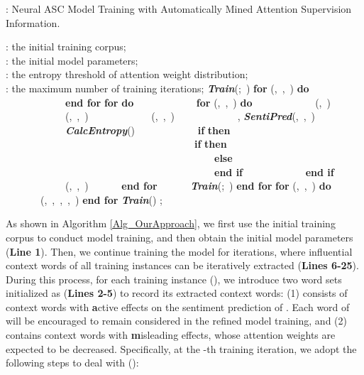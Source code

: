 \documentclass[11pt,a4paper]{article}
\begin{document}
{
\renewcommand\baselinestretch{1.15}
\begin{algorithm}[t]
\renewcommand{\algorithmicrequire}{\textbf{Input:}}\footnotesize
\renewcommand\algorithmicensure {\textbf{Return:} }\footnotesize
\caption{: Neural ASC Model Training with Automatically Mined Attention Supervision Information.}
\label{Alg_OurApproach}
\begin{algorithmic}[1]
\REQUIRE
: the initial training corpus;\\
: the initial model parameters;\\
: the entropy threshold of attention weight distribution;\\
: the maximum number of training iterations;
\STATE   \textit{\textbf{Train}}(;\ )
\STATE \textbf{for} (,\ ,\ )   \textbf{do}
\STATE \ \ \ \ \ \   
\STATE \ \ \ \ \ \   
\STATE \textbf{end for}
\STATE \textbf{for}  \textbf{do}
\STATE \ \ \ \ \ \   
\STATE \ \ \ \ \ \ \textbf{for} (,\ ,\ )   \textbf{do}
\STATE \ \ \ \ \ \ \ \ \ \ \ \   (,\ )
\STATE \ \ \ \ \ \ \ \ \ \ \ \   (,\ ,\ )
\STATE \ \ \ \ \ \ \ \ \ \ \ \    (,\ ,\ )
\STATE \ \ \ \ \ \ \ \ \ \ \ \ ,   \textit{\textbf{SentiPred}}(,\ ,\ )
\STATE \ \ \ \ \ \ \ \ \ \ \ \   \textit{\textbf{CalcEntropy}}()
\STATE \ \ \ \ \ \ \ \ \ \ \ \ \textbf{if}    \textbf{then}
\STATE \ \ \ \ \ \ \ \ \ \ \ \ \ \ \ \ \ \ \    
\STATE \ \ \ \ \ \ \ \ \ \ \ \ \ \ \ \ \ \ \ \textbf{if}    \textbf{then}
\STATE \ \ \ \ \ \ \ \ \ \ \ \ \ \ \ \ \ \ \ \ \ \ \     
\STATE \ \ \ \ \ \ \ \ \ \ \ \ \ \ \ \ \ \ \ \textbf{else}
\STATE \ \ \ \ \ \ \ \ \ \ \ \ \ \ \ \ \ \ \ \ \ \ \     
\STATE \ \ \ \ \ \ \ \ \ \ \ \ \ \ \ \ \ \ \ \textbf{end if}
\STATE \ \ \ \ \ \ \ \ \ \ \ \ \textbf{end if}
\STATE \ \ \ \ \ \ \ \ \ \ \ \     (,\ ,\ )
\STATE \ \ \ \ \ \ \textbf{end for}
\STATE \ \ \ \ \ \   \textit{\textbf{Train}}(;\ )
\STATE \textbf{end for}
\STATE   
\STATE \textbf{for} (,\ ,\ )   \textbf{do}
\STATE \ \ \ \ \ \ \     (,\ ,\ ,\ ,\ )
\STATE \textbf{end for}
\STATE   \textit{\textbf{Train}}()
\ENSURE ;
\end{algorithmic}
\end{algorithm}
\par}

As shown in Algorithm \ref{Alg_OurApproach},
we first use the initial training corpus  to conduct model training,
and then obtain the initial model parameters  (\textbf{Line 1}).
Then,
we continue training the model for  iterations,
where influential context words of all training instances can be iteratively extracted (\textbf{Lines 6-25}).
During this process,
for each training instance (),
we introduce two word sets initialized as  (\textbf{Lines 2-5}) to record its extracted context words:
(1)  consists of context words with \textbf{a}ctive effects on the sentiment prediction of .
Each word of  will be encouraged to remain considered in the refined model training,
and
(2)  contains context words with \textbf{m}isleading effects,
whose attention weights are expected to be decreased.
Specifically,
at the -th training iteration,
we adopt the following steps to deal with ():
\end{document}

